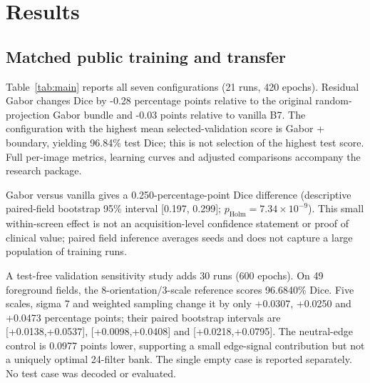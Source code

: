 \documentclass{article}
\begin{document}
\section{Results}
\begin{table}[t]
\centering\small
\caption{New public training: three-seed means. Dice shows seed SD. BF1 uses two native pixels. TNBC is patient-macro transfer, not histology-trained performance.}
\label{tab:main}
\end{table}

\subsection{Matched public training and transfer}
Table~\ref{tab:main} reports all seven configurations (21 runs, 420 epochs). Residual Gabor changes Dice by -0.28 percentage points relative to the original random-projection Gabor bundle and -0.03 points relative to vanilla B7. The configuration with the highest mean selected-validation score is Gabor + boundary, yielding 96.84\% test Dice; this is not selection of the highest test score. Full per-image metrics, learning curves and adjusted comparisons accompany the research package.

Gabor versus vanilla gives a 0.250-percentage-point Dice difference (descriptive paired-field bootstrap 95\% interval [0.197, 0.299]; $p_{\mathrm{Holm}}=7.34\times10^{-9}$). This small within-screen effect is not an acquisition-level confidence statement or proof of clinical value; paired field inference averages seeds and does not capture a large population of training runs.

A test-free validation sensitivity study adds 30 runs (600 epochs). On 49 foreground fields, the 8-orientation/3-scale reference scores 96.6840\% Dice. Five scales, sigma 7 and weighted sampling change it by only +0.0307, +0.0250 and +0.0473 percentage points; their paired bootstrap intervals are [+0.0138,+0.0537], [+0.0098,+0.0408] and [+0.0218,+0.0795]. The neutral-edge control is 0.0977 points lower, supporting a small edge-signal contribution but not a uniquely optimal 24-filter bank. The single empty case is reported separately. No test case was decoded or evaluated.
\end{document}
